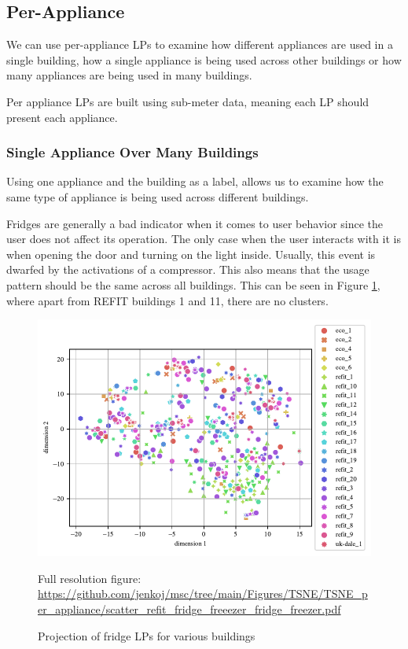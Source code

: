 \subsection{Per-Appliance}

We can use per-appliance LPs to examine how different appliances 
are used in a single building, how a single appliance is being used across other buildings or how many appliances are being used in many buildings.

Per appliance LPs are built using sub-meter data,
meaning each LP should present each appliance.

\subsubsection{Single Appliance Over Many Buildings}

Using one appliance and the building as a label,
allows us to examine how the same type of appliance is being used across different buildings.

Fridges are generally a bad indicator when it comes to user behavior since the user does not affect its operation. 
The only case when the user interacts with it is when opening the door and turning on the light inside. 
Usually, this event is dwarfed by the activations of a compressor. 
This also means that the usage pattern should be the same across all buildings. 
This can be seen in Figure \ref{fig:tsne_pa_scatter_all_fridge}, 
where apart from REFIT buildings 1 and 11, there are no clusters.


\begin{figure}[H]
	\centering
	\caption{Projection of fridge LPs for various buildings}
	\includegraphics[]{Figures/TSNE/TSNE_per_appliance/scatter_refit_fridge_freeezer_fridge_freezer.pdf}
	\label{fig:tsne_pa_scatter_all_fridge}
	\par
	\par\footnotesize{Full resolution figure: \url{https://github.com/jenkoj/msc/tree/main/Figures/TSNE/TSNE_per_appliance/scatter_refit_fridge_freeezer_fridge_freezer.pdf}}
\end{figure}

